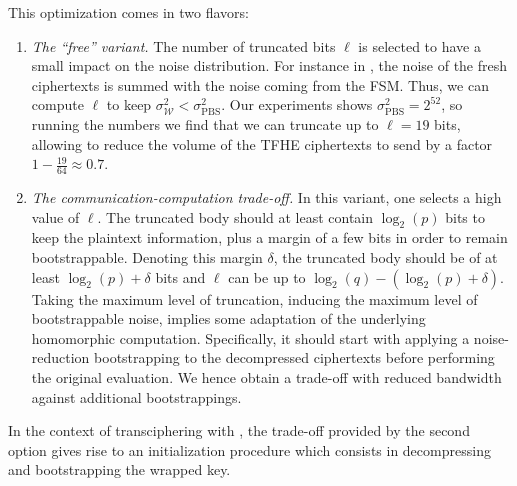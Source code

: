 \noindent This optimization comes in two flavors:
\begin{enumerate}
	\item \emph{The ``free'' variant.} The number of truncated bits $\ell$ is selected to have a small impact on the noise distribution. For instance in \coolName, the noise of the fresh ciphertexts is summed with the noise coming from the FSM. Thus, we can compute $\ell$ to keep $\sigma^2_{\mathcal W} < \sigma^2_{\text{PBS}}$. Our experiments shows $\sigma^2_{\text{PBS}} = 2^{52}$, so running the numbers we find that we can truncate up to $\ell=19$ bits, allowing to reduce the volume of the TFHE ciphertexts to send by a factor $1 - \frac{19}{64} \approx 0.7$.
	
	\smallskip
	
	\item \emph{The communication-computation trade-off.} In this variant, one selects a high value of $\ell$. The truncated body should at least contain $\log_2(p)$ bits to keep the plaintext information, plus a margin of a few bits in order to remain bootstrappable. Denoting this margin $\delta$, the truncated body should be of at least $\log_2(p) + \delta$ bits and $\ell$ can be up to $\log_2(q) - (\log_2(p)+\delta)$. Taking the maximum level of truncation, inducing the maximum level of bootstrappable noise, implies some adaptation of the underlying homomorphic computation. Specifically, it should start with applying a noise-reduction bootstrapping to the decompressed ciphertexts before performing the original evaluation. We hence obtain a trade-off with reduced bandwidth against additional bootstrappings.
\end{enumerate}

In the context of transciphering with \coolName, the trade-off provided by the second option gives rise to an initialization procedure which consists in decompressing and bootstrapping the wrapped key. 


\ifeprint{

}
\fi





